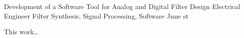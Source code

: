 \documentclass[tg]{mdtufsm}
\begin{document}
\begin{abstract}
Uma tarefa comum no projeto de sistemas eletrônicos é o projeto de filtros analógicos e digitais visando melhorar as características de um sinal ou separar sinais de interesse em meio ao ruído ou a outros sinais irrelevantes. Porém, o procedimento de projeto destes envolve grande número de cálculos.

Neste trabalho propõe-se uma ferramenta computacional para a realização desta\dots
\end{abstract}

\begin{englishabstract}
{Development of a Software Tool for Analog and Digital Filter Design}
{Electrical Engineer}
{Filter Synthesis, Signal Processing, Software}
{June}
{st}

This work\dots
\end{englishabstract}


\listoffigures

\listoftables


\listofannex
\end{document}
